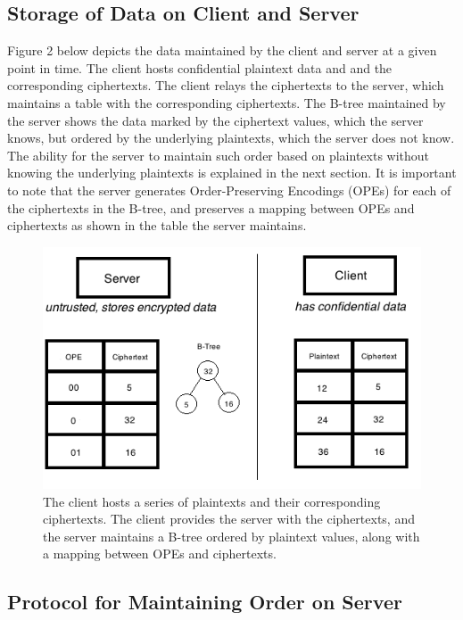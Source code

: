 \documentclass[12pt]{article}
\begin{document}
\subsection{Storage of Data on Client and Server}

Figure 2 below depicts the data maintained by the client and server at a given point in time. The client hosts confidential plaintext data and and the corresponding ciphertexts. The client relays the ciphertexts to the server, which maintains a table with the corresponding ciphertexts. The B-tree maintained by the server shows the data marked by the ciphertext values, which the server knows, but ordered by the underlying plaintexts, which the server does not know. The ability for the server to maintain such order based on plaintexts without knowing the underlying plaintexts is explained in the next section. It is important to note that the server generates Order-Preserving Encodings (OPEs) for each of the ciphertexts in the B-tree, and preserves a mapping between OPEs and ciphertexts as shown in the table the server maintains.

\begin{figure}[htb]
\begin{center}
\includegraphics[scale=0.6]{857pic6.png}
\caption{The client hosts a series of plaintexts and their corresponding ciphertexts. The client provides the server with the ciphertexts, and the server maintains a B-tree ordered by plaintext values, along with a mapping between OPEs and ciphertexts.}
\end{center}
\end{figure}

\subsection{Protocol for Maintaining Order on Server}
\end{document}
